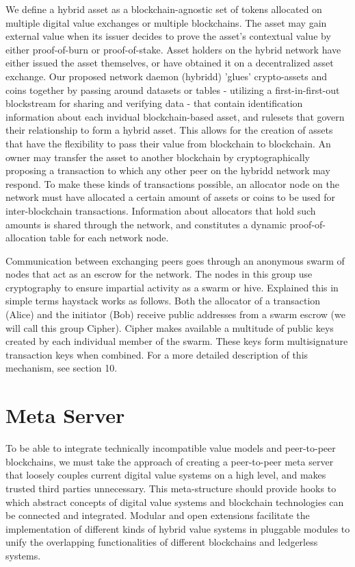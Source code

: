 \documentclass[a4paper]{article}
\begin{document}
We define a hybrid asset as a blockchain-agnostic set of tokens\cite{coloredcoins} allocated on multiple digital value exchanges or multiple blockchains. The asset may gain external value when its issuer decides to prove the asset's contextual value by either proof-of-burn\cite{proofofburn} or proof-of-stake. Asset holders on the hybrid network have either issued the asset themselves, or have obtained it on a decentralized asset exchange. Our proposed network daemon (hybridd) 'glues' crypto-assets and coins together by passing around datasets or tables - utilizing a first-in-first-out blockstream for sharing and verifying data - that contain identification information about each invidual blockchain-based asset, and rulesets that govern their relationship to form a hybrid asset. This allows for the creation of assets that have the flexibility to pass their value from blockchain to blockchain. An owner may transfer the asset to another blockchain by cryptographically proposing a transaction to which any other peer on the hybridd network may respond. To make these kinds of transactions possible, an allocator node on the network must have allocated a certain amount of assets or coins to be used for inter-blockchain transactions. Information about allocators that hold such amounts is shared through the network, and constitutes a dynamic proof-of-allocation table for each network node.

Communication between exchanging peers goes through an anonymous swarm of nodes that act as an escrow for the network. The nodes in this group use \haystack cryptography to ensure impartial activity as a swarm or hive. Explained this in simple terms haystack works as follows. Both the allocator of a transaction (Alice) and the initiator (Bob) receive public addresses from a swarm escrow (we will call this group Cipher). Cipher makes available a multitude of public keys created by each individual member of the swarm. These keys form multisignature transaction keys\cite{multisig} when combined. For a more detailed description of this mechanism, see section 10.

\section{Meta Server}
To be able to integrate technically incompatible value models and peer-to-peer blockchains, we must take the approach of creating a peer-to-peer meta server that loosely couples current digital value systems on a high level, and makes trusted third parties unnecessary. This meta-structure should provide hooks to which abstract concepts of digital value systems and blockchain technologies can be connected and integrated. Modular and open extensions facilitate the implementation of different kinds of hybrid value systems in pluggable modules to unify the overlapping functionalities of different blockchains and ledgerless systems.
\end{document}
